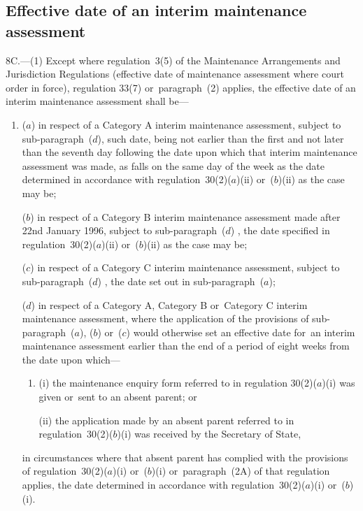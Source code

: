 \documentclass[a4paper,12pt]{article}
\begin{document}
\subsection[8C. Effective date of an interim maintenance assessment]{Effective date of an interim maintenance assessment}

8C.—(1) Except where regulation~3(5) of the Maintenance Arrangements and Jurisdiction Regulations (effective date of maintenance assessment where court order in force), regulation 
33(7) or~paragraph~(2) applies, the effective date of an interim maintenance assessment shall be—
\begin{enumerate}\item[]
($a$) in respect of a Category A interim maintenance assessment, subject to 
sub-paragraph~($d$), such date, being not earlier than the first and not later than the seventh day following the date upon which that interim maintenance assessment was made, as falls on the same day of the week as the date determined in accordance with regulation~30(2)($a$)(ii) or~($b$)(ii) as the case may be;

($b$) in respect of a Category B interim maintenance assessment made after 22nd January 1996, subject to sub-paragraph~($d$)%
, the date specified in regulation~30(2)($a$)(ii) or~($b$)(ii) as the case may be;

($c$) in respect of a Category C interim maintenance assessment, subject to sub-paragraph~($d$)%
, the date set out in sub-paragraph~($a$);

($d$) in respect of a Category A, Category B or~Category C interim maintenance assessment, where the application of the provisions of sub-\hspace{0pt}paragraph~($a$), ($b$) or~($c$) would otherwise set an effective date for~an interim maintenance assessment earlier than the end of a period of eight weeks from the date upon which—
\begin{enumerate}\item[]
\begin{sloppypar}
(i) the maintenance enquiry form referred to in regulation 30(2)($a$)(i) was given or~sent to an absent parent; or
\end{sloppypar}

(ii) the application made by an absent parent referred to in regulation~30(2)($b$)(i) was received by the Secretary of State,
\end{enumerate}
in circumstances where that absent parent has complied with the provisions of regulation~30(2)($a$)(i) or~($b$)(i) or~paragraph~(2A) of that regulation applies, the date determined in accordance with regulation~30(2)($a$)(i) or~($b$)(i).
\end{enumerate}
\end{document}
